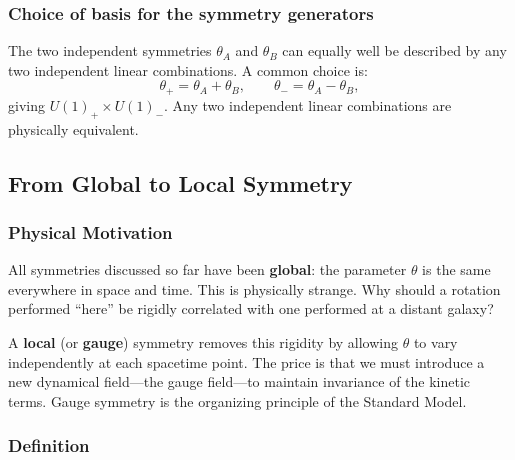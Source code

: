 \documentclass[../main.tex]{subfiles}
\begin{document}
\subsubsection*{Choice of basis for the symmetry generators}

The two independent symmetries $\theta_A$ and $\theta_B$ can equally well be described by any two independent linear combinations.  A common choice is:
\begin{equation}
  \theta_+ = \theta_A + \theta_B, \qquad \theta_- = \theta_A - \theta_B,
  \label{eq:lec10:linear-combinations}
\end{equation}
giving $U(1)_+\times U(1)_-$.  Any two independent linear combinations are physically equivalent.

\subsection*{From Global to Local Symmetry}

\subsubsection*{Physical Motivation}

All symmetries discussed so far have been \textbf{global}: the parameter $\theta$ is the same everywhere in space and time.  This is physically strange.  Why should a rotation performed ``here'' be rigidly correlated with one performed at a distant galaxy?

A \textbf{local} (or \textbf{gauge}) symmetry removes this rigidity by allowing $\theta$ to vary independently at each spacetime point.  The price is that we must introduce a new dynamical field—the gauge field—to maintain invariance of the kinetic terms.  Gauge symmetry is the organizing principle of the Standard Model.

\subsubsection*{Definition}

\end{document}
